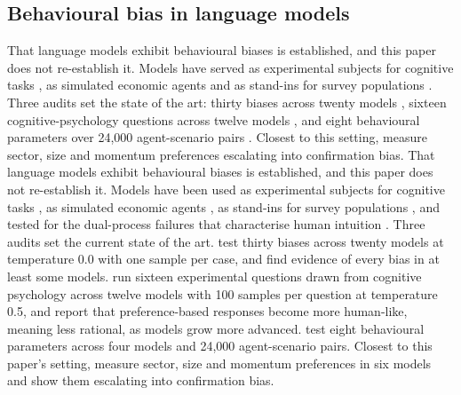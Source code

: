 \subsection{Behavioural bias in language models}
\ifsubmission
That language models exhibit behavioural biases is established, and this
paper does not re-establish it. Models have served as experimental subjects
for cognitive tasks \citep{binz2023cognitive, hagendorff2023intuitive}, as
simulated economic agents \citep{horton2023homosilicus} and as stand-ins for
survey populations \citep{argyle2023silicon, aher2023simulating}. Three
audits set the state of the art: thirty biases across twenty models
\citep{malberg2025comprehensive}, sixteen cognitive-psychology questions
across twelve models \citep{bini2026behavioral}, and eight behavioural
parameters over 24{,}000 agent-scenario pairs \citep{yee2026calibrating}.
Closest to this setting, \citet{lee2025yourai} measure sector, size and
momentum preferences escalating into confirmation bias.
\else
That language models exhibit behavioural biases is established, and this
paper does not re-establish it. Models have been used as experimental
subjects for cognitive tasks \citep{binz2023cognitive}, as simulated
economic agents \citep{horton2023homosilicus}, as stand-ins for survey
populations \citep{argyle2023silicon, aher2023simulating}, and tested for
the dual-process failures that characterise human intuition
\citep{hagendorff2023intuitive}. Three audits set the current state of the
art. \citet{malberg2025comprehensive} test thirty biases across twenty
models at temperature 0.0 with one sample per case, and find evidence of
every bias in at least some models. \citet{bini2026behavioral} run sixteen
experimental questions drawn from cognitive psychology across twelve models
with 100 samples per question at temperature 0.5, and report that
preference-based responses become more human-like, meaning less rational, as
models grow more advanced. \citet{yee2026calibrating} test eight behavioural
parameters across four models and 24{,}000 agent-scenario pairs. Closest to
this paper's setting, \citet{lee2025yourai} measure sector, size and
momentum preferences in six models and show them escalating into
confirmation bias.
\fi

